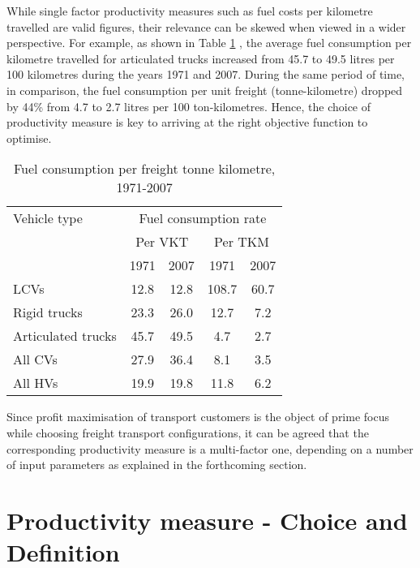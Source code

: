 \documentclass[ExampleMasters.tex]{subfiles}
\begin{document}
		While single factor productivity measures such as fuel costs per kilometre travelled are valid figures, their relevance can be skewed when viewed in a wider perspective. For example, as shown in Table \ref{table:fuelConsumptionRate} \cite[T.~2.8]{TruckProdAus}, the average fuel consumption per kilometre travelled for articulated trucks increased from 45.7 to 49.5 litres per 100 kilometres during the years 1971 and 2007. During the same period of time, in comparison, the fuel consumption per unit freight (tonne-kilometre) dropped by 44\% from 4.7 to 2.7 litres per 100 ton-kilometres. Hence, the choice of productivity measure is key to arriving at the right objective function to optimise.\\

		\begin{table}[ht]
			\centering 
			\begin{tabular}{l c c c c}
  			\hline
			Vehicle type & \multicolumn{4}{c}{Fuel consumption rate}\\ \cline{2-3} \cline{4-5}
			\ & \multicolumn{2}{c}{Per VKT} & \multicolumn{2}{c}{Per TKM}\\ \cline{2-3} \cline{4-5}
			\ & 1971 & 2007 & 1971 & 2007\\ \hline
			    LCVs  & 12.8 & 12.8 & 108.7 & 60.7\\
			    Rigid trucks  & 23.3 & 26.0 & 12.7  & 7.2\\
			    Articulated trucks  & 45.7 & 49.5 & 4.7 & 2.7  \\
			    All CVs  & 27.9 & 36.4 & 8.1 & 3.5 \\
			    All HVs  & 19.9 & 19.8 & 11.8 & 6.2 \\
			\hline 
			\end{tabular}
			\caption{Fuel consumption per freight tonne kilometre, 1971-2007 \cite{TruckProdAus}} 
			\label{table:fuelConsumptionRate} 
		\end{table}

		Since profit maximisation of transport customers is the object of prime focus while choosing freight transport configurations, it can be agreed that the corresponding productivity measure is a multi-factor one, depending on a number of input parameters as explained in the forthcoming section.\\

	\section{Productivity measure - Choice and Definition}
\end{document}
